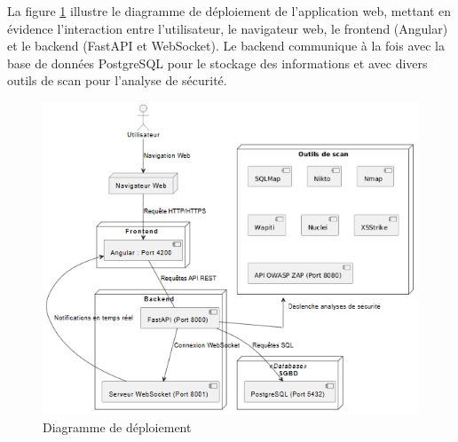 La figure \ref{fig:deploiement} illustre le diagramme de déploiement de l'application web, mettant en évidence l'interaction entre l'utilisateur, le navigateur web, le frontend (Angular) et le backend (FastAPI et WebSocket).
Le backend communique à la fois avec la base de données PostgreSQL pour le stockage des informations et avec divers outils de scan pour l'analyse de sécurité.
\begin{figure}[H]
    \centering \includegraphics[width=\linewidth]{chapitres/ch2/img/deag deploiemt.PNG}
    \caption{Diagramme de déploiement}
    \label{fig:deploiement}
\end{figure}
\vspace{-0.5cm}